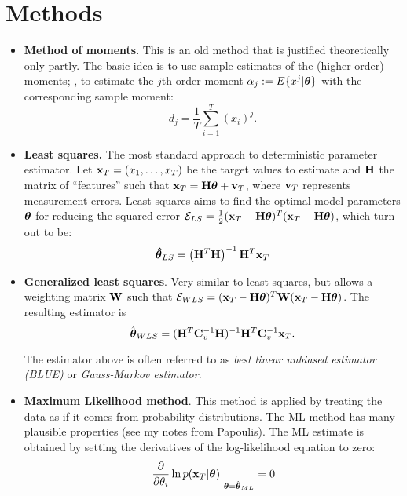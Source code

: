 \documentclass[a4paper]{book}
\begin{document}
\section{Methods}
\begin{itemize}
\item \textbf{Method of moments}. This is an old method that is justified theoretically only partly. The basic idea is to use sample estimates of the (higher-order) moments; \eg, to estimate the $j$th order moment $\alpha_j:=E\{x^j|\boldsymbol{\theta}\}$ with the corresponding sample moment:%
$$ d_j=\frac{1}{T}\sum\limits_{i=1}^T (x_i)^j  .$$
\item \textbf{Least squares.}  The most standard approach to deterministic parameter estimator. Let $\mathbf{x}_T=(x_1,\hdots,x_T)$ be the target values to estimate and $\mathbf{H}$ the matrix of ``features'' such that $\mathbf{x}_T = \mathbf{H}\boldsymbol{\theta} + \mathbf{v}_T $, where $\mathbf{v}_T$ represents measurement errors. Least-squares aims to find the optimal model parameters $\boldsymbol \theta$ for reducing the squared error $\mathcal{E}_{LS}=\frac{1}{2}(\mathbf{x}_T-\mathbf H \boldsymbol \theta)^T(\mathbf{x}_T-\mathbf H \boldsymbol \theta)$, which turn out to be:%
 $$\boldsymbol{\hat{\theta}}_{LS}=\left(\mathbf{H}^T\mathbf H\right)^{-1}\mathbf{H}^T\mathbf{x}_T$$ 
\item \textbf{Generalized least squares}. Very similar to least squares, but allows a weighting matrix $\mathbf{W}$ such that $\mathcal{E}_{WLS} = (\mathbf{x}_T-\mathbf H \boldsymbol \theta)^T\mathbf W (\mathbf{x}_T-\mathbf H \boldsymbol \theta)$. The resulting estimator is $$\hat{\boldsymbol \theta}_{WLS}=(\mathbf H^T\mathbf{C}_v^{-1}\mathbf H)^{-1} \mathbf{H}^T \mathbf{C}_v^{-1} \mathbf{x}_T.$$

The estimator above is often referred to as \textit{best linear unbiased estimator (BLUE)} or \textit{Gauss-Markov estimator}.
\item \textbf{Maximum Likelihood method}. This method is applied by treating the data as if it comes from probability distributions. The ML method has many plausible properties (see my notes from Papoulis). The ML estimate is obtained by setting the derivatives of the log-likelihood equation to zero: %
$$\left.\frac{\partial}{\partial \theta_i}\ln p(\mathbf{x}_T | \boldsymbol{\theta})\right|_{\boldsymbol{\theta}=\hat{\boldsymbol{\theta}}_{ML}}=0$$
\end{itemize}
\end{document}

